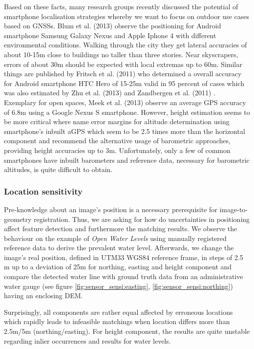 \documentclass[review]{elsarticle}
\begin{document}
Based on these facts, many research groups recently discussed the potential of smartphone localisation strategies whereby we want to focus on outdoor use cases based on \glspl{GNSS}. Blum et al. (2013) \cite{Blum2013} observe the positioning for Android smartphone Samsung Galaxy Nexus and Apple Iphone 4 with different environmental conditions. Walking through the city they get lateral accuracies of about 10-15m close to buildings no taller than three stories. Near skyscrapers, errors of about 30m should be expected with local extremas up to 60m. Similar things are published by Fritsch et al. (2011) \cite{Fritsch2011} who determined a overall accuracy for Android smartphone HTC Hero of 15-25m valid in 95 percent of cases which was also estimated by Zhu et al. (2013) \cite{Zhu2013} and Zandbergen et al. (2011) \cite{Zandbergen2011}. Exemplary for open spaces, Meek et al. (2013) \cite{Meek2013} observe an average \gls{GPS} accuracy of 6.8m using a Google Nexus S smartphone. However, height estimation seems to be more critical where \cite{Liu2014} name error margins for altitude determination using smartphone's inbuilt \gls{aGPS} which seem to be 2.5 times more than the horizontal component and recommend the alternative usage of barometric approaches, providing height accuracies up to 3m. Unfortunately, only a few of common smartphones have inbuilt barometers and reference data, necessary for barometric altitudes, is quite difficult to obtain.  


\subsubsection{Location sensitivity}
\label{sec:technology:sensors:location_sensitivity}

Pre-knowledge about an image's position is a necessary prerequisite for image-to-geometry registration. Thus, we are asking for how do uncertainties in positioning affect feature detection and furthermore the matching results. We observe the behaviour on the example of \textit{Open Water Levels} using manually registered reference data to derive the prevalent water level. Afterwards, we change the image's real position, defined in UTM33 WGS84 reference frame, in steps of 2.5 m up to a deviation of 25m for northing, easting and height component and compare the detected water line with ground truth data from an administrative water gauge (see figure \ref{fig:sensor_sensi:easting}, \ref{fig:sensor_sensi:northing}) having an enclosing \gls{DEM}.

Surprisingly, all components are rather equal affected by erroneous locations which rapidly leads to infeasible matchings when location differs more than 2.5m/5m (northing/easting). For height component, the results are quite unstable regarding inlier occurrences and results for water levels. 
\end{document}
